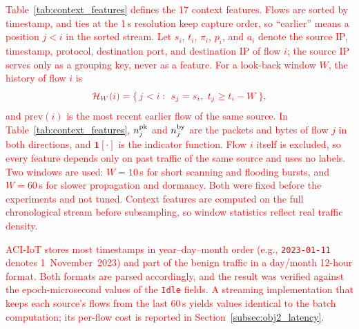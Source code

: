 \documentclass[conference]{IEEEtran}
\begin{document}
\textcolor{red}{Table~\ref{tab:context_features} defines
the 17 context features. Flows are sorted by timestamp, and ties at
the 1\,s resolution keep capture order, so ``earlier'' means a
position $j<i$ in the sorted stream. Let $s_i$, $t_i$, $\pi_i$,
$p_i$, and $a_i$ denote the source IP, timestamp, protocol,
destination port, and destination IP of flow $i$; the source IP
serves only as a grouping key, never as a feature. For a look-back
window $W$, the history of flow $i$ is}
\begin{equation}
\textcolor{red}{\mathcal{H}_W(i)=\{\,j<i:\ s_j=s_i,\ t_j\ge t_i-W\,\},}
\label{eq:context_history}
\end{equation}
\textcolor{red}{and $\mathrm{prev}(i)$ is the most recent
earlier flow of the same source. In Table~\ref{tab:context_features},
$n^{\rm pk}_j$ and $n^{\rm by}_j$ are the packets and bytes of flow
$j$ in both directions, and $\mathbf{1}[\cdot]$ is the indicator
function. Flow $i$ itself is excluded, so
every feature depends only on past traffic of the same source and
uses no labels. Two windows are used: $W=10$\,s for short scanning
and flooding bursts, and $W=60$\,s for slower propagation and
dormancy. Both were fixed before the experiments and not tuned.
Context features are computed on the full chronological stream
before subsampling, so window statistics reflect real traffic
density.}

\textcolor{red}{ACI-IoT stores most timestamps in
year--day--month order (e.g., \texttt{2023-01-11} denotes
1~November~2023) and part of the benign traffic in a day/month
12-hour format. Both formats are parsed accordingly, and the result
was verified against the epoch-microsecond values of the
\texttt{Idle} fields. A streaming implementation that keeps each
source's flows from the last 60\,s yields values identical to the
batch computation; its per-flow cost is reported in
Section~\ref{subsec:obj2_latency}.}
\end{document}
